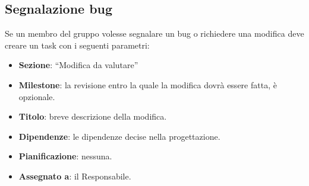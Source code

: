 \subsection{Segnalazione bug}

Se un membro del gruppo volesse segnalare un bug o richiedere una modifica deve creare un task con i seguenti parametri:
\begin{itemize}
 \item \textbf{Sezione}: ``Modifica da valutare''
 \item \textbf{Milestone}: la revisione entro la quale la modifica dovrà essere fatta, è opzionale.
 \item \textbf{Titolo}: breve descrizione della modifica.
 \item \textbf{Dipendenze}: le dipendenze decise nella progettazione.
 \item \textbf{Pianificazione}: nessuna.
 \item \textbf{Assegnato a}: il Responsabile.
\end{itemize}
